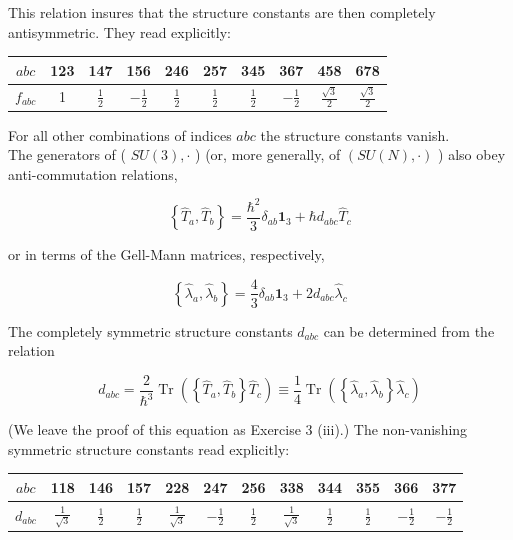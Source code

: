 \documentclass[10pt, letterpaper]{article}
\begin{document}
This relation insures that the structure constants are then completely antisymmetric. They read explicitly:

\begin{center}
\begin{tabular}{c||c|c|c|c|c|c|c|c|c}
$a b c$ & 123 & 147 & 156 & 246 & 257 & 345 & 367 & 458 & 678 \\
\hline
$f_{a b c}$ & 1 & $\frac{1}{2}$ & $-\frac{1}{2}$ & $\frac{1}{2}$ & $\frac{1}{2}$ & $\frac{1}{2}$ & $-\frac{1}{2}$ & $\frac{\sqrt{3}}{2}$ & $\frac{\sqrt{3}}{2}$ \\
\hline
\end{tabular}
\end{center}

For all other combinations of indices $a b c$ the structure constants vanish.\\
The generators of ( $S U(3), \cdot$ ) (or, more generally, of $(S U(N), \cdot)$ ) also obey anti-commutation relations,

$$
\left\{\hat{T}_{a}, \hat{T}_{b}\right\}=\frac{\hbar^{2}}{3} \delta_{a b} \mathbf{1}_{3}+\hbar d_{a b c} \hat{T}_{c}
$$

or in terms of the Gell-Mann matrices, respectively,

$$
\left\{\hat{\lambda}_{a}, \hat{\lambda}_{b}\right\}=\frac{4}{3} \delta_{a b} \mathbf{1}_{3}+2 d_{a b c} \hat{\lambda}_{c}
$$

The completely symmetric structure constants $d_{a b c}$ can be determined from the relation

$$
d_{a b c}=\frac{2}{\hbar^{3}} \operatorname{Tr}\left(\left\{\hat{T}_{a}, \hat{T}_{b}\right\} \hat{T}_{c}\right) \equiv \frac{1}{4} \operatorname{Tr}\left(\left\{\hat{\lambda}_{a}, \hat{\lambda}_{b}\right\} \hat{\lambda}_{c}\right)
$$

(We leave the proof of this equation as Exercise 3 (iii).) The non-vanishing symmetric structure constants read explicitly:

\begin{center}
\begin{tabular}{c||c|c|c|c|c|c|c|c|c|c|c}
$a b c$ & 118 & 146 & 157 & 228 & 247 & 256 & 338 & 344 & 355 & 366 & 377 \\
\hline
$d_{a b c}$ & $\frac{1}{\sqrt{3}}$ & $\frac{1}{2}$ & $\frac{1}{2}$ & $\frac{1}{\sqrt{3}}$ & $-\frac{1}{2}$ & $\frac{1}{2}$ & $\frac{1}{\sqrt{3}}$ & $\frac{1}{2}$ & $\frac{1}{2}$ & $-\frac{1}{2}$ & $-\frac{1}{2}$ \\
\hline
\end{tabular}
\end{center}
\end{document}
